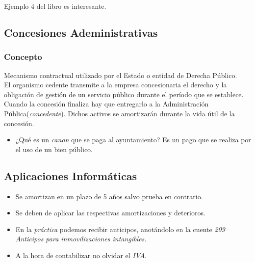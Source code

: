\documentclass[a4paper,12pt]{article}
\begin{document}
\begin{tcolorbox}[colback=green!5!white,colframe=blue!75!black, title=Nota]
Ejemplo 4 del libro es interesante.
\end{tcolorbox}

\subsection{Concesiones Adeministrativas}
\subsubsection{Concepto}
Mecanismo contractual utilizado por el Estado o entidad de Derecha Público.\\

El organismo cedente transmite a la empresa concesionaria el derecho y la obligación de gestión de un servicio público durante el período que se establece.\\

Cuando la concesión finaliza hay que entregarlo a la Administración Pública(\textit{concedente}). Dichos activos se amortizarán durante la vida útil de la concesión.\\

\begin{tcolorbox}[colback=yellow!5!white,colframe=yellow!75!black, title=Nota]
\begin{itemize}
    \item ¿Qué es un \textit{canon} que se paga al ayuntamiento? Es un pago que se realiza por el uso de un bien público.
\end{itemize}
\end{tcolorbox}


\subsection{Aplicaciones Informáticas}

\begin{itemize}
\item Se amortizan en un plazo de 5 años salvo prueba en contrario.\\

\item Se deben de aplicar las respectivas amortizaciones y deterioros.\\

\item  En la \textit{práctica} podemos recibir anticipos, anotándolo en la cuente \textit{209 Anticipos para inmovilizaciones intangibles.}

\item A la hora de contabilizar no olvidar el \textit{IVA}.
\end{itemize}
\end{document}
